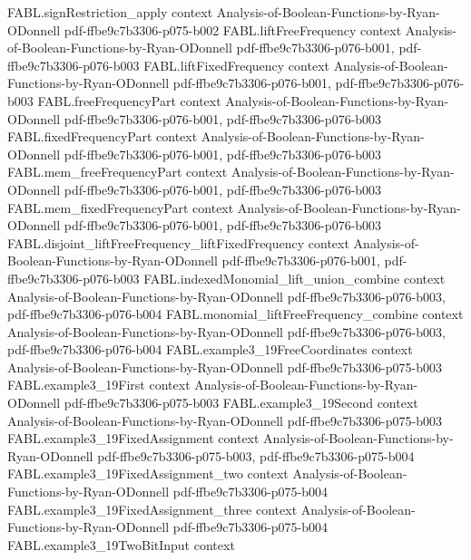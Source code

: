 \begin{theorem}
\proofstep
  {FABL.signRestriction_apply}
  {context}
  {Analysis-of-Boolean-Functions-by-Ryan-ODonnell}
  {pdf-ffbe9c7b3306-p075-b002}
\proofstep
  {FABL.liftFreeFrequency}
  {context}
  {Analysis-of-Boolean-Functions-by-Ryan-ODonnell}
  {pdf-ffbe9c7b3306-p076-b001,
    pdf-ffbe9c7b3306-p076-b003}
\proofstep
  {FABL.liftFixedFrequency}
  {context}
  {Analysis-of-Boolean-Functions-by-Ryan-ODonnell}
  {pdf-ffbe9c7b3306-p076-b001,
    pdf-ffbe9c7b3306-p076-b003}
\proofstep
  {FABL.freeFrequencyPart}
  {context}
  {Analysis-of-Boolean-Functions-by-Ryan-ODonnell}
  {pdf-ffbe9c7b3306-p076-b001,
    pdf-ffbe9c7b3306-p076-b003}
\proofstep
  {FABL.fixedFrequencyPart}
  {context}
  {Analysis-of-Boolean-Functions-by-Ryan-ODonnell}
  {pdf-ffbe9c7b3306-p076-b001,
    pdf-ffbe9c7b3306-p076-b003}
\proofstep
  {FABL.mem_freeFrequencyPart}
  {context}
  {Analysis-of-Boolean-Functions-by-Ryan-ODonnell}
  {pdf-ffbe9c7b3306-p076-b001,
    pdf-ffbe9c7b3306-p076-b003}
\proofstep
  {FABL.mem_fixedFrequencyPart}
  {context}
  {Analysis-of-Boolean-Functions-by-Ryan-ODonnell}
  {pdf-ffbe9c7b3306-p076-b001,
    pdf-ffbe9c7b3306-p076-b003}
\proofstep
  {FABL.disjoint_liftFreeFrequency_liftFixedFrequency}
  {context}
  {Analysis-of-Boolean-Functions-by-Ryan-ODonnell}
  {pdf-ffbe9c7b3306-p076-b001,
    pdf-ffbe9c7b3306-p076-b003}
\proofstep
  {FABL.indexedMonomial_lift_union_combine}
  {context}
  {Analysis-of-Boolean-Functions-by-Ryan-ODonnell}
  {pdf-ffbe9c7b3306-p076-b003,
    pdf-ffbe9c7b3306-p076-b004}
\proofstep
  {FABL.monomial_liftFreeFrequency_combine}
  {context}
  {Analysis-of-Boolean-Functions-by-Ryan-ODonnell}
  {pdf-ffbe9c7b3306-p076-b003,
    pdf-ffbe9c7b3306-p076-b004}
\proofstep
  {FABL.example3_19FreeCoordinates}
  {context}
  {Analysis-of-Boolean-Functions-by-Ryan-ODonnell}
  {pdf-ffbe9c7b3306-p075-b003}
\proofstep
  {FABL.example3_19First}
  {context}
  {Analysis-of-Boolean-Functions-by-Ryan-ODonnell}
  {pdf-ffbe9c7b3306-p075-b003}
\proofstep
  {FABL.example3_19Second}
  {context}
  {Analysis-of-Boolean-Functions-by-Ryan-ODonnell}
  {pdf-ffbe9c7b3306-p075-b003}
\proofstep
  {FABL.example3_19FixedAssignment}
  {context}
  {Analysis-of-Boolean-Functions-by-Ryan-ODonnell}
  {pdf-ffbe9c7b3306-p075-b003,
    pdf-ffbe9c7b3306-p075-b004}
\proofstep
  {FABL.example3_19FixedAssignment_two}
  {context}
  {Analysis-of-Boolean-Functions-by-Ryan-ODonnell}
  {pdf-ffbe9c7b3306-p075-b004}
\proofstep
  {FABL.example3_19FixedAssignment_three}
  {context}
  {Analysis-of-Boolean-Functions-by-Ryan-ODonnell}
  {pdf-ffbe9c7b3306-p075-b004}
\proofstep
  {FABL.example3_19TwoBitInput}
  {context}

\end{theorem}
